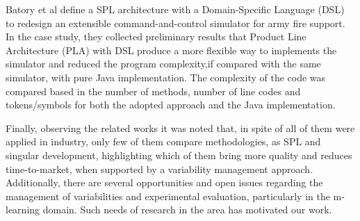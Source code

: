 Batory et al \cite{batory02} define a SPL architecture with a Domain-Specific Language (DSL) to redesign an extensible command-and-control simulator for army fire support. In the case study, they collected preliminary results that Product Line Architecture (PLA) with DSL produce a more flexible way to implements the simulator and reduced the program complexity,if compared with the same simulator, with pure Java implementation. The complexity of the code was compared based in the number of methods, number of line codes and tokens/symbols for both the adopted approach and the Java implementation.

Finally, observing the related works it was noted that, in spite of all of them were applied in industry, only few of them compare methodologies, as SPL and singular development, highlighting which of them bring more quality and reduces time-to-market, when supported by a variability management approach. Additionally, there are several opportunities and open issues regarding the management of variabilities and experimental evaluation, particularly in the m-learning domain. Such needs of research in the area has motivated our work.